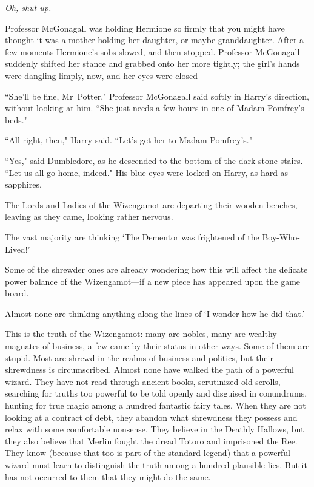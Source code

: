 \emph{Oh, shut up.}

Professor McGonagall was holding Hermione so firmly that you might have thought it was a mother holding her daughter, or maybe granddaughter. After a few moments Hermione's sobs slowed, and then stopped. Professor McGonagall suddenly shifted her stance and grabbed onto her more tightly; the girl's hands were dangling limply, now, and her eyes were closed—

``She'll be fine, Mr~Potter," Professor McGonagall said softly in Harry's direction, without looking at him. ``She just needs a few hours in one of Madam Pomfrey's beds."

``All right, then," Harry said. ``Let's get her to Madam Pomfrey's."

``Yes," said Dumbledore, as he descended to the bottom of the dark stone stairs. ``Let us all go home, indeed." His blue eyes were locked on Harry, as hard as sapphires.

\later

The Lords and Ladies of the Wizengamot are departing their wooden benches, leaving as they came, looking rather nervous.

The vast majority are thinking `The Dementor was frightened of the Boy-Who-Lived!'

Some of the shrewder ones are already wondering how this will affect the delicate power balance of the Wizengamot—if a new piece has appeared upon the game board.

Almost none are thinking anything along the lines of `I wonder how he did that.'

This is the truth of the Wizengamot: many are nobles, many are wealthy magnates of business, a few came by their status in other ways. Some of them are stupid. Most are shrewd in the realms of business and politics, but their shrewdness is circumscribed. Almost none have walked the path of a powerful wizard. They have not read through ancient books, scrutinized old scrolls, searching for truths too powerful to be told openly and disguised in conundrums, hunting for true magic among a hundred fantastic fairy tales. When they are not looking at a contract of debt, they abandon what shrewdness they possess and relax with some comfortable nonsense. They believe in the Deathly Hallows, but they also believe that Merlin fought the dread Totoro and imprisoned the Ree. They know (because that too is part of the standard legend) that a powerful wizard must learn to distinguish the truth among a hundred plausible lies. But it has not occurred to them that they might do the same.

